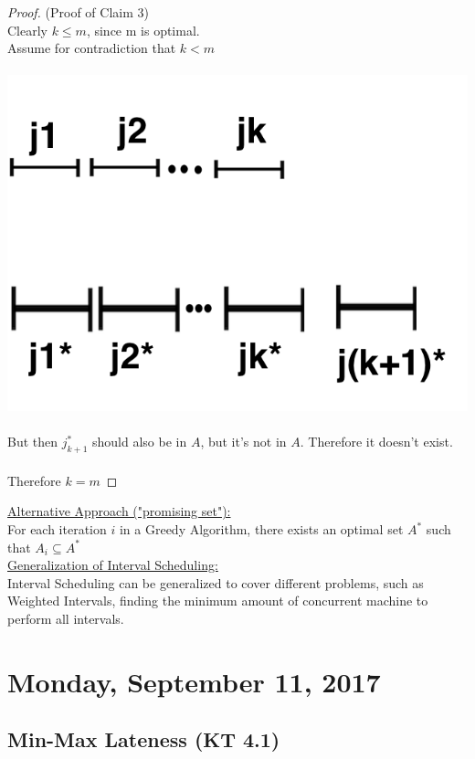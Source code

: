 \documentclass[12pt]{article}
\begin{document}
\begin{proof}(Proof of Claim 3)\\

Clearly $k\leq m$, since m is optimal.\\
Assume for contradiction that $k < m$\\
\\
\includegraphics{interval6}\\
\\
But then $j^*_{k+1}$ should also be in $A$, but it's not in $A$. Therefore it doesn't exist.\\
\\
Therefore $k=m$
\end{proof}

\underline{Alternative Approach ("promising set"):}\\
For each iteration $i$ in a Greedy Algorithm, there exists an optimal set $A^*$ such that $A_i \subseteq A^*$\\

\underline{Generalization of Interval Scheduling:}\\
Interval Scheduling can be generalized to cover different problems, such as Weighted Intervals, finding the minimum amount of concurrent machine to perform all intervals.

\section{Monday, September 11, 2017}

\subsection{Min-Max Lateness (KT 4.1)}
\end{document}
